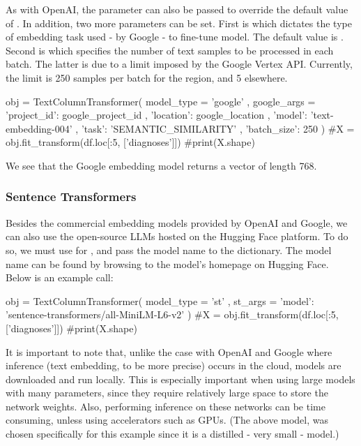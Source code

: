 \documentclass[article]{jss}
\begin{document}
As with OpenAI, the  parameter can also be passed to override the default value of . In addition, two more parameters can be set. First is  which dictates the type of embedding task used - by Google - to fine-tune model. The default value is . Second is  which specifies the number of text samples to be processed in each batch. The latter is due to a limit imposed by the Google Vertex API. Currently, the limit is 250 samples per batch for the  region, and 5 elsewhere.

\begin{pyblock}
obj = TextColumnTransformer(
    model_type = 'google'
    , google_args = {
        'project_id': google_project_id
        , 'location': google_location
        , 'model': 'text-embedding-004'
        , 'task': 'SEMANTIC_SIMILARITY'
        , 'batch_size': 250
    }
)
#X = obj.fit_transform(df.loc[:5, ['diagnoses']])
#print(X.shape)
\end{pyblock}

We see that the Google embedding model returns a vector of length 768.

\subsubsection{Sentence Transformers}\label{subsubsec:using-embed-st}

Besides the commercial embedding models provided by OpenAI and Google, we can also use the open-source LLMs hosted on the Hugging Face platform. To do so, we must use  for , and pass the model name to the  dictionary. The model name can be found by browsing to the model's homepage on Hugging Face. Below is an example call:
\begin{pyblock}
obj = TextColumnTransformer(
    model_type = 'st'
    , st_args = {
        'model': 'sentence-transformers/all-MiniLM-L6-v2'
    }
)
#X = obj.fit_transform(df.loc[:5, ['diagnoses']])
#print(X.shape)
\end{pyblock}

It is important to note that, unlike the case with OpenAI and Google where inference (text embedding, to be more precise) occurs in the cloud,  models are downloaded and run locally. This is especially important when using large models with many parameters, since they require relatively large space to store the network weights. Also, performing inference on these networks can be time consuming, unless using accelerators such as GPUs. (The above model,  was chosen specifically for this example since it is a distilled - very small - model.)
\end{document}
